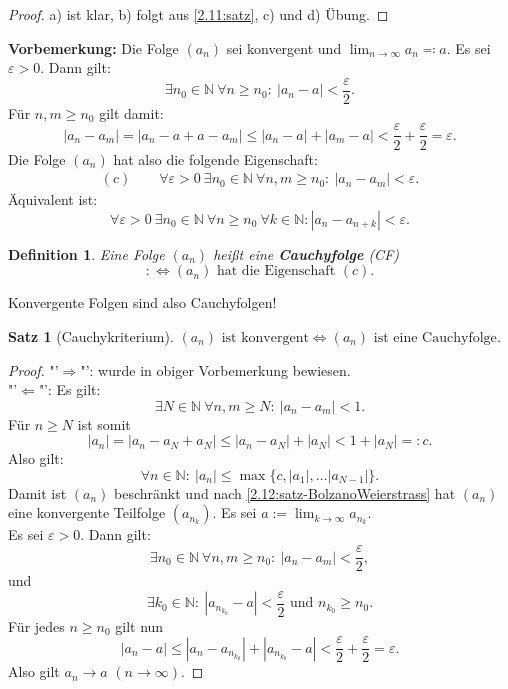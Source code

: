 \documentclass[12pt]{extreport} %
\newcommand{\N}{\mathbb{N}}
\theoremstyle{named}
\theoremstyle{itshape}
\newtheorem{satz}[unnamedtheorem]{Satz}
\newtheorem*{definition}{Definition}
\theoremstyle{normal}
\begin{document}
\begin{proof}
	a) ist klar, b) folgt aus \ref{2.11:satz}, c) und d) Übung.
\end{proof}


\textbf{Vorbemerkung:} Die Folge $(a_{n})$ sei konvergent und $\lim_{n \rightarrow \infty}  a_{n} \eqqcolon a$. Es sei $\varepsilon > 0$. Dann gilt:
	$$ \exists n_{0} \in \N ~ \forall n \geq n_{0}: ~ |a_{n} - a| < \frac{\varepsilon}{2}.$$
Für $n, m \geq n_{0}$ gilt damit:
	$$ |a_{n} - a_{m}| = |a_{n} - a + a - a_{m} | \leq |a_{n} - a| + |a_{m} - a| < \frac{\varepsilon}{2} + \frac{\varepsilon}{2} = \varepsilon. $$
Die Folge $(a_{n})$ hat also die folgende Eigenschaft:
	\begin{align*}
	(c) \quad \quad	\forall \varepsilon > 0 ~  \exists n_{0} \in \N ~ \forall n,m \geq n_{0}: ~ |a_{n} - a_{m}| < \varepsilon.
	\end{align*}
Äquivalent ist:	
$$\forall \varepsilon > 0 ~\exists n_{0} \in \N ~ \forall n \ge n_0 ~ \forall k \in \N: |a_{n} - a_{n+k}| < \varepsilon.$$

\begin{definition} 
	Eine Folge $(a_{n})$ hei{\ss}t eine \textbf{Cauchyfolge} (CF)
	$$ :\iff (a_{n}) \text{ hat die Eigenschaft } (c). $$	
\end{definition}


Konvergente Folgen sind also Cauchyfolgen!

\begin{satz}[Cauchykriterium] $(a_{n}) \text{ ist konvergent} \iff (a_{n}) \text{ ist eine Cauchyfolge}$. \label{2.15:prop} 
\end{satz}

\begin{proof}
	"'$\Rightarrow$"': wurde in obiger Vorbemerkung bewiesen. \\
	"'$\Leftarrow$"': Es gilt:
	$$
	\exists N \in \N ~ \forall n,m \ge N: ~ |a_n-a_m| < 1.
	$$
	Für $n \ge N$ ist somit
	$$
	|a_n| = |a_n-a_N+a_N| \le |a_n-a_N|+|a_N| < 1+|a_N| =: c.
	$$
	Also gilt:
	$$
	\forall n \in \N: ~ |a_n| \le \max\{c,|a_1|, \dots |a_{N-1}|\}.
	$$
	Damit ist $(a_n)$ beschränkt und nach \ref{2.12:satz-BolzanoWeierstrass} hat $(a_n)$ eine konvergente Teilfolge $(a_{n_{k}})$.
	Es sei $a:= \lim_{k \to \infty} a_{n_{k}}$. \\
	Es sei $\varepsilon > 0$. Dann gilt:
	$$
	\exists n_0 \in \N ~ \forall n,m \ge n_0: ~ |a_n-a_m| < \frac{\varepsilon}{2},
	$$
	und
	$$
	\exists k_0 \in \N: ~ |a_{n_{k_0}}-a| < \frac{\varepsilon}{2} \text{ und } n_{k_0} \ge n_0.
	$$
	Für jedes $n \ge n_0$ gilt nun
	$$
	|a_n-a| \le|a_n- a_{n_{k_0}}| + |a_{n_{k_0}}-a| < \frac{\varepsilon}{2}+\frac{\varepsilon}{2}= \varepsilon.
	$$
	Also gilt $a_n \to a$ $(n \to \infty)$.
\end{proof}
\end{document}
